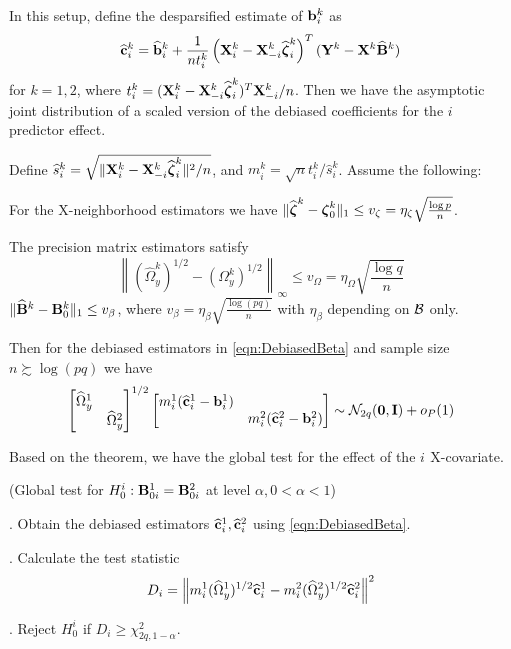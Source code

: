 \documentclass[12pt, letterpaper]{article}
\DeclareMathOperator*{\Th}{^{\text{th}}}
\numberwithin{equation}{section}
\begin{document}
In this setup, define the desparsified estimate of ${\bf{b}}_i^k$ as
%
\begin{align}\label{eqn:DebiasedBeta}
\widehat {{\bf{c}}}_i^k = \widehat {{\bf{b}}}_i^k + \frac{1}{n t_i^k} \left( {\mathbf{X}}_i^k - {\mathbf{X}}_{-i}^k \widehat {{\boldsymbol{\zeta}}}_i^k \right)^T
({\mathbf{Y}}^k - {\mathbf{X}}^k \widehat {{\mathbf{B}}}^k )
\end{align}
%
for $k = 1,2$, where $t_i^k = ( {\mathbf{X}}_i^k - {\mathbf{X}}_{-i}^k \widehat {{\boldsymbol{\zeta}}}_i^k )^T {\mathbf{X}}_{-i}^k/n$. Then we have the asymptotic joint distribution of a scaled version of the debiased coefficients for the $i\Th$ predictor effect.

\begin{Theorem}\label{Thm:ThmTesting}
Define $\widehat s_i^k = \sqrt{\| {\mathbf{X}}_i^k - {\mathbf{X}}_{-i}^k \widehat {{\boldsymbol{\zeta}}}_i^k \|^2/n}$, and $m_i^k = \sqrt n t_i^k / \widehat s_i^k$. Assume the following:

 For the X-neighborhood estimators we have $\| \widehat {{\boldsymbol{\zeta}}}^k - {\boldsymbol{\zeta}}_0^k \|_1 \leq v_\zeta = \eta_\zeta \sqrt { \frac{\log p}{n}}$.

 The precision matrix estimators satisfy
%
$$
\left\| (\widehat \Omega_y^k)^{1/2} - (\Omega_y^k)^{1/2} \right\|_\infty \leq v_\Omega =
\eta_\Omega \sqrt { \frac{\log q}{n}}
$$
%
 $\| \widehat {{\mathbf{B}}}^k - {\mathbf{B}}^k_0 \|_1 \leq v_\beta$, where $v_\beta = \eta_\beta \sqrt{\frac{\log (pq)}{n}}$ with $\eta_\beta$ depending on ${\cal{B}}$ only.

Then for the debiased estimators in \eqref{eqn:DebiasedBeta} and sample size $n \succsim \log (pq)$ we have
%
\begin{align}\label{eqn:ThmTestingEqn}
\begin{bmatrix}
\widehat \Omega_y^1 &\\
& \widehat \Omega_y^2
\end{bmatrix}^{1/2}
%
\begin{bmatrix}
m_i^1 (\widehat \bfc_i^1 - \bfb_i^1) &\\
&  m_i^2 (\widehat \bfc_i^2 - \bfb_i^2)
\end{bmatrix}
\sim \cN_{2q} ({\bf 0}, \bfI) + o_P(1)
\end{align}
%
\end{Theorem}
%

Based on the theorem, we have the global test for the effect of the $i^{\Th}$ X-covariate.

\begin{Algorithm}\label{algo:AlgoGlobalTest}
(Global test for $H_0^i: {\mathbf{B}}_{0 i}^1 = {\mathbf{B}}_{0 i}^2$ at level $\alpha, 0< \alpha< 1$)

. Obtain the debiased estimators $\widehat {{\bf{c}}}_i^1, \widehat {{\bf{c}}}_i^2$ using \eqref{eqn:DebiasedBeta}.


. Calculate the test statistic
%
$$
D_i = \left\| m_i^1 (\widehat \Omega_y^1)^{1/2} \widehat {{\bf{c}}}_i^1 - 
 m_i^2 (\widehat \Omega_y^2)^{1/2} \widehat {{\bf{c}}}_i^2 \right\|^2
$$
%

. Reject $H_0^i$ if $D_i \geq \chi^2_{2q, 1-\alpha}$.
\end{Algorithm}
\end{document}
